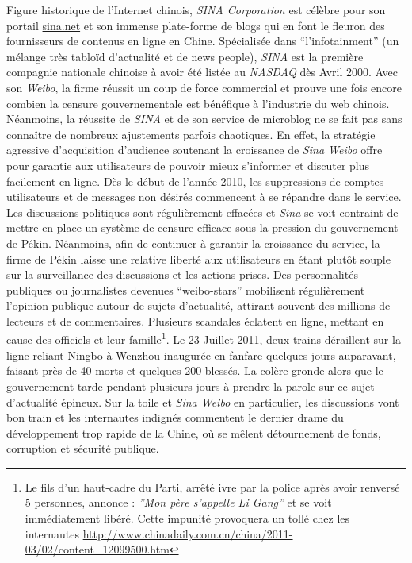 Figure historique de l’Internet chinois, \textit{SINA Corporation} est célèbre pour son portail \url{sina.net} et son immense plate-forme de blogs qui en font le fleuron des fournisseurs de contenus en ligne en Chine. Spécialisée dans ``l’infotainment'' (un mélange très tabloïd d’actualité et de news people), \textit{SINA} est la première compagnie nationale chinoise à avoir été listée au \textit{NASDAQ} dès Avril 2000. Avec son \textit{Weibo}, la firme réussit un coup de force commercial et prouve une fois encore combien la censure gouvernementale est bénéfique à l’industrie du web chinois. Néanmoins, la réussite de \textit{SINA} et de son service de microblog ne se fait pas sans connaître de nombreux ajustements parfois chaotiques. En effet, la stratégie agressive d’acquisition d’audience soutenant la croissance de \textit{Sina Weibo} offre pour garantie aux utilisateurs de pouvoir mieux s’informer et discuter plus facilement en ligne. Dès le début de l’année 2010, les suppressions de comptes utilisateurs et de messages non désirés commencent à se répandre dans le service. Les discussions politiques sont régulièrement effacées et \textit{Sina} se voit contraint de mettre en place un système de censure efficace sous la pression du gouvernement de Pékin. Néanmoins, afin de continuer à garantir la croissance du service, la firme de Pékin laisse une relative liberté aux utilisateurs en étant plutôt souple sur la surveillance des discussions et les actions prises. Des personnalités publiques ou journalistes devenues “weibo-stars” mobilisent régulièrement l’opinion publique autour de sujets d’actualité, attirant souvent des millions de lecteurs et de commentaires. Plusieurs scandales éclatent en ligne, mettant en cause des officiels et leur famille\footnote{Le fils d’un haut-cadre du Parti, arrêté ivre par la police après avoir renversé 5 personnes, annonce : \textit{”Mon père s’appelle Li Gang”} et se voit immédiatement libéré. Cette impunité provoquera un tollé chez les internautes \url{http://www.chinadaily.com.cn/china/2011-03/02/content_12099500.htm}}. Le 23 Juillet 2011, deux trains déraillent sur la ligne reliant Ningbo à Wenzhou inaugurée en fanfare quelques jours auparavant, faisant près de 40 morts et quelques 200 blessés. La colère gronde alors que le gouvernement tarde pendant plusieurs jours à prendre la parole sur ce sujet d’actualité épineux. Sur la toile et \textit{Sina Weibo} en particulier, les discussions vont bon train et les internautes indignés commentent le dernier drame du développement trop rapide de la Chine, où se mêlent détournement de fonds, corruption et sécurité publique. 


